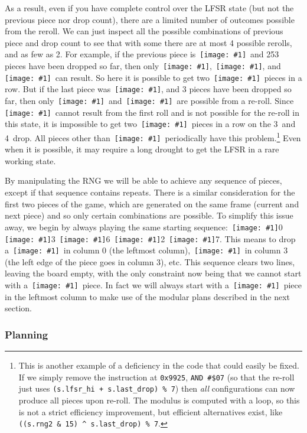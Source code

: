 \documentclass[twocolumn]{article}
\newcommand\tetrispiece[1]{\,\texttt{[image: \#1]}\hspace{0.1em}}
\newcommand\ihoriz{\tetrispiece{i_horiz}}
\newcommand\squarepiece{\tetrispiece{square}}
\newcommand\tup{\tetrispiece{t_up}}
\newcommand\jleft{\tetrispiece{j_left}}
\newcommand\jdown{\tetrispiece{j_down}}
\newcommand\jright{\tetrispiece{j_right}}
\newcommand\zhoriz{\tetrispiece{z_horiz}}
\newcommand\shoriz{\tetrispiece{s_horiz}}
\newcommand\svert{\tetrispiece{s_vert}}
\newcommand\lup{\tetrispiece{l_up}}
\newcommand\lleft{\tetrispiece{l_left}}
\newcommand\lright{\tetrispiece{l_right}}
\begin{document}
As a result, even if you have complete control over the LFSR state
(but not the previous piece nor drop count), there are a limited
number of outcomes possible from the reroll. We can just inspect all
the possible combinations of previous piece and drop count to see that
with some there are at most 4 possible rerolls, and as few as 2. For
example, if the previous piece is \shoriz\ and 253 pieces have been
dropped so far, then only \tup, \shoriz, and \jdown\ can result. So
here it is possible to get two \shoriz\ pieces in a row. But if the
last piece was \ihoriz, and 3 pieces have been dropped so far, then
only \zhoriz\ and \lup\ are possible from a re-roll. Since
\ihoriz\ cannot result from the first roll and is not possible for the
re-roll in this state, it is impossible to get two \ihoriz\ pieces in
a row on the 3\rd\ and 4\th\ drop. All pieces other than
\squarepiece\ periodically have this problem.\!\footnote{This is
  another example of a deficiency in the code that could easily be
  fixed. If we simply remove the instruction at {\tt 0x9925},
  \verb+AND #$07+ (so that the re-roll just uses
  \verb|(s.lfsr_hi + s.last_drop) % 7|) then {\it all} configurations
  can now produce all pieces upon re-roll. The modulus is computed
  with a loop, so this is not a strict efficiency improvement, but
  efficient alternatives exist, like \verb|((s.rng2 & 15) ^ s.last_drop) % 7|.
} Even when it is possible, it may
require a long drought to get the LFSR in a rare working state.

By manipulating the RNG we will be able to achieve any sequence of
pieces, except if that sequence contains repeats. There is a similar
consideration for the first two pieces of the game, which are
generated on the same frame (current and next piece) and so only
certain combinations are possible. To simplify this issue away, we
begin by always playing the same starting sequence: \squarepiece 0
\lleft 3 \jright 6 \lright 2 \jleft 7. This means to drop a
\squarepiece\ in column 0 (the leftmost column), \lleft\ in column 3
(the left edge of the piece goes in column 3), etc. This sequence
clears two lines, leaving the board empty, with the only constraint
now being that we cannot start with a \jleft\ piece. In fact we will
always start with a \svert\ piece in the leftmost column to make
use of the modular plans described in the next section.

\subsubsection{Planning}
\end{document}
